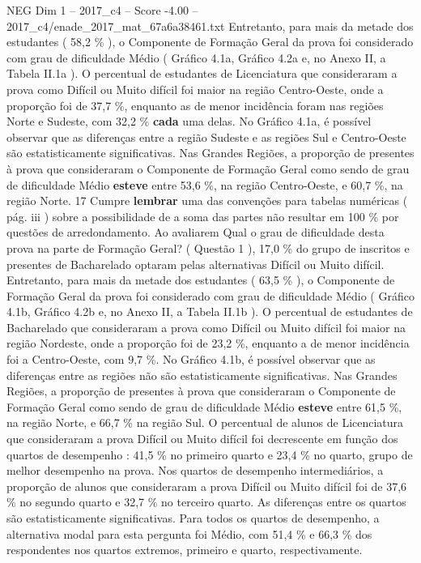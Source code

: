 \begin{textsample}{NEG Dim 1 – 2017\_c4 – Score -4.00 – 2017\_c4/enade\_2017\_mat\_67a6a38461.txt}
Entretanto, para mais da metade dos estudantes ( 58,2 \% ), o Componente de Formação Geral da prova foi considerado com grau de dificuldade Médio ( Gráfico 4.1a, Gráfico 4.2a e, no Anexo II, a Tabela II.1a ).
O percentual de estudantes de Licenciatura que consideraram a prova como Difícil ou Muito difícil foi maior na região Centro-Oeste, onde a proporção foi de 37,7 \%, enquanto as de menor incidência foram nas regiões Norte e Sudeste, com 32,2 \% \textbf{cada} uma delas.
No Gráfico 4.1a, é possível observar que as diferenças entre a região Sudeste e as regiões Sul e Centro-Oeste são estatisticamente significativas.
Nas Grandes Regiões, a proporção de presentes à prova que consideraram o Componente de Formação Geral como sendo de grau de dificuldade Médio \textbf{esteve} entre 53,6 \%, na região Centro-Oeste, e 60,7 \%, na região Norte. 17 Cumpre \textbf{lembrar} uma das convenções para tabelas numéricas ( pág. iii ) sobre a possibilidade de a soma das partes não resultar em 100 \% por questões de arredondamento.
Ao avaliarem Qual o grau de dificuldade desta prova na parte de Formação Geral? ( Questão 1 ), 17,0 \% do grupo de inscritos e presentes de Bacharelado optaram pelas alternativas Difícil ou Muito difícil.
Entretanto, para mais da metade dos estudantes ( 63,5 \% ), o Componente de Formação Geral da prova foi considerado com grau de dificuldade Médio ( Gráfico 4.1b, Gráfico 4.2b e, no Anexo II, a Tabela II.1b ).
O percentual de estudantes de Bacharelado que consideraram a prova como Difícil ou Muito difícil foi maior na região Nordeste, onde a proporção foi de 23,2 \%, enquanto a de menor incidência foi a Centro-Oeste, com 9,7 \%.
No Gráfico 4.1b, é possível observar que as diferenças entre as regiões não são estatisticamente significativas.
Nas Grandes Regiões, a proporção de presentes à prova que consideraram o Componente de Formação Geral como sendo de grau de dificuldade Médio \textbf{esteve} entre 61,5 \%, na região Norte, e 66,7 \% na região Sul.
O percentual de alunos de Licenciatura que consideraram a prova Difícil ou Muito difícil foi decrescente em função dos quartos de desempenho : 41,5 \% no primeiro quarto e 23,4 \% no quarto, grupo de melhor desempenho na prova.
Nos quartos de desempenho intermediários, a proporção de alunos que consideraram a prova Difícil ou Muito difícil foi de 37,6 \% no segundo quarto e 32,7 \% no terceiro quarto.
As diferenças entre os quartos são estatisticamente significativas.
Para todos os quartos de desempenho, a alternativa modal para esta pergunta foi Médio, com 51,4 \% e 66,3 \% dos respondentes nos quartos extremos, primeiro e quarto, respectivamente.

\end{textsample}
